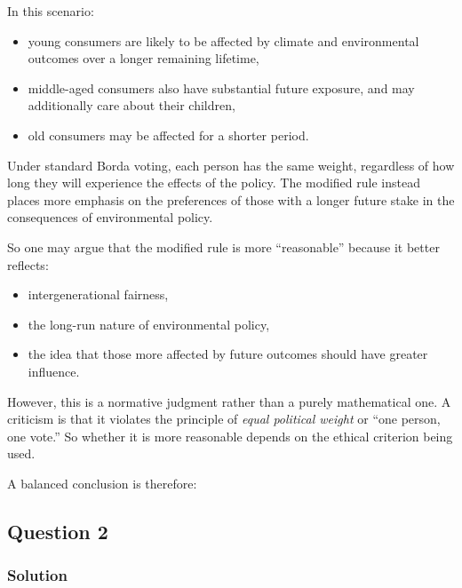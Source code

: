 \documentclass[12pt]{article}
\begin{document}
\begin{enumerate}[label=(\alph*)]
    In this scenario:
    \begin{itemize}
        \item young consumers are likely to be affected by climate and environmental outcomes over a longer remaining lifetime,
        \item middle-aged consumers also have substantial future exposure, and may additionally care about their children,
        \item old consumers may be affected for a shorter period.
    \end{itemize}

    Under standard Borda voting, each person has the same weight, regardless of how long they will experience the effects of the policy. The modified rule instead places more emphasis on the preferences of those with a longer future stake in the consequences of environmental policy.

    So one may argue that the modified rule is more ``reasonable'' because it better reflects:
    \begin{itemize}
        \item intergenerational fairness,
        \item the long-run nature of environmental policy,
        \item the idea that those more affected by future outcomes should have greater influence.
    \end{itemize}

    However, this is a normative judgment rather than a purely mathematical one. A criticism is that it violates the principle of \emph{equal political weight} or ``one person, one vote.'' So whether it is more reasonable depends on the ethical criterion being used.

    A balanced conclusion is therefore:
    \begin{center}
    \end{center}
\end{enumerate}

\newpage
\subsection{Question 2}
\subsubsection{Solution}
\end{document}

